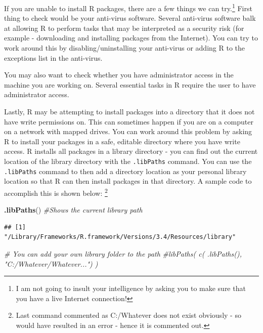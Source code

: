 \documentclass[]{krantz}
\makeatletter
\newenvironment{Shaded}{\begin{snugshade}}{\end{snugshade}}
\newcommand{\KeywordTok}[1]{\textcolor[rgb]{0.27,0.27,0.27}{\textbf{#1}}}
\newcommand{\CommentTok}[1]{\textcolor[rgb]{0.56,0.35,0.01}{\textit{#1}}}
\newcommand{\NormalTok}[1]{#1}
\newenvironment{kframe}{%
\medskip{}
\setlength{\fboxsep}{.8em}
 \def\at@end@of@kframe{}%
 \ifinner\ifhmode%
  \def\at@end@of@kframe{\end{minipage}}%
  \begin{minipage}{\columnwidth}%
 \fi\fi%
 \def\FrameCommand##1{\hskip\@totalleftmargin \hskip-\fboxsep
 \colorbox{shadecolor}{##1}\hskip-\fboxsep
     \hskip-\linewidth \hskip-\@totalleftmargin \hskip\columnwidth}%
 \MakeFramed {\advance\hsize-\width
   \@totalleftmargin\z@ \linewidth\hsize
   \@setminipage}}%
 {\par\unskip\endMakeFramed%
 \at@end@of@kframe}
\renewenvironment{Shaded}{\begin{kframe}}{\end{kframe}}
\theoremstyle{definition}
\theoremstyle{definition}
\theoremstyle{definition}
\theoremstyle{remark}
\makeatother
\begin{document}
If you are unable to install R packages, there are a few things we can
try.\footnote{I am not going to insult your intelligence by asking you
  to make sure that you have a live Internet connection!} First thing to
check would be your anti-virus software. Several anti-virus software
balk at allowing R to perform tasks that may be interpreted as a
security risk (for example - downloading and installing packages from
the Internet). You can try to work around this by disabling/uninstalling
your anti-virus or adding R to the exceptions list in the anti-virus.

You may also want to check whether you have administrator access in the
machine you are working on. Several essential tasks in R require the
user to have administrator access.

Lastly, R may be attempting to install packages into a directory that it
does not have write permissions on. This can sometimes happen if you are
on a computer on a network with mapped drives. You can work around this
problem by asking R to install your packages in a safe, editable
directory where you have write access. R installs all packages in a
library directory - you can find out the current location of the library
directory with the \texttt{.libPaths} command. You can use the
\texttt{.libPaths} command to then add a directory location as your
personal library location so that R can then install packages in that
directory. A sample code to accomplish this is shown below: \footnote{Last
  command commented as C:/Whatever does not exist obviously - so would
  have resulted in an error - hence it is commented out.}

\begin{Shaded}
\begin{Highlighting}[]
\KeywordTok{.libPaths}\NormalTok{() }\CommentTok{#Shows the current library path}
\end{Highlighting}
\end{Shaded}

\begin{verbatim}
## [1] "/Library/Frameworks/R.framework/Versions/3.4/Resources/library"
\end{verbatim}

\begin{Shaded}
\begin{Highlighting}[]
\CommentTok{# You can add your own library folder to the path}
\CommentTok{#libPaths( c( .libPaths(), "C:/Whatever/Whatever...") )}
\end{Highlighting}
\end{Shaded}
\end{document}
